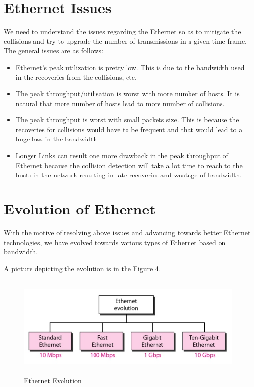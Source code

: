 \documentclass[12pt]{article}
\begin{document}

\section{Ethernet Issues}
We need to understand the issues regarding the Ethernet so as to mitigate the collisions and try to upgrade the number of transmissions in a given time frame. The general issues are as follows:
\begin{itemize}
    \item Ethernet's peak utilization is pretty low. This is due to the     bandwidth used in the recoveries from the collisions, etc.
    \item The peak throughput/utilisation is worst with more number of hosts. It is natural that more number of hosts lead to more number of collisions.
    \item The peak throughput is worst with small packets size. This is because the recoveries for collisions would have to be frequent and that would lead to a huge loss in the bandwidth.
    \item Longer Links can result one more drawback in the peak throughput of Ethernet because the collision detection will take a lot time to reach to the hosts in the network resulting in late recoveries and wastage of bandwidth.
\end{itemize}


\section{Evolution of Ethernet}

With the motive of resolving above issues and advancing towards better Ethernet technologies, we have evolved towards various types of Ethernet based on bandwidth.

A picture depicting the evolution is in the Figure 4.
\begin{figure}
    \centering
    \includegraphics[width=15cm, height=5cm]{ethernet_evolution.png}
    \caption{Ethernet Evolution}
\end{figure}
\end{document}
